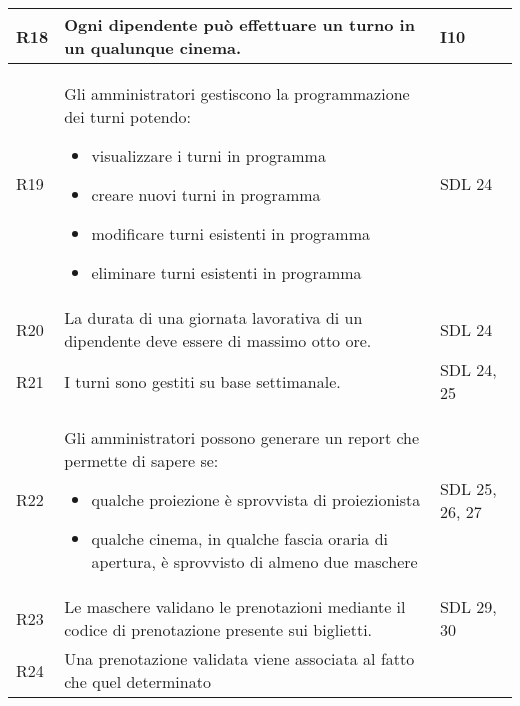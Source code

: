 \begin{longtable}{|p{0.8cm}|p{13.4cm}|p{2.1cm}|}
      R18                                                                     &
      Ogni dipendente può effettuare un turno in un qualunque cinema.         &
      I10
      \\\hline
      R19                                                                     &
      Gli amministratori gestiscono la programmazione dei turni
      potendo:
      \begin{itemize}
            \item visualizzare i turni in programma
            \item creare nuovi turni in programma
            \item modificare turni esistenti in programma
            \item eliminare turni esistenti in programma
      \end{itemize}                           &
      SDL 24
      \\\hline
      R20                                                                     &
      La durata di una giornata lavorativa di un dipendente deve essere di
      massimo otto ore.                                                       &
      SDL 24
      \\\hline
      R21                                                                     &
      I turni sono gestiti su base settimanale.                               &
      SDL 24, 25
      \\\hline
      R22                                                                     &
      Gli amministratori possono generare un report che permette di sapere se:
      \begin{itemize}
            \item qualche proiezione è sprovvista di proiezionista
            \item qualche cinema, in qualche fascia oraria di apertura,
                  è sprovvisto di almeno due maschere
      \end{itemize}             &
      SDL 25, 26, 27
      \\\hline
      R23                                                                     &
      Le maschere validano le prenotazioni mediante il codice di prenotazione
      presente sui biglietti.                                                 &
      SDL 29, 30
      \\\hline
      R24                                                                     &
      Una prenotazione validata viene associata al fatto che quel determinato

\end{longtable}
